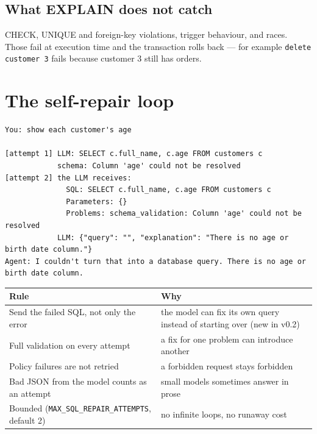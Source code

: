 \documentclass[11pt,a4paper]{article}
\begin{document}
\subsection*{What EXPLAIN does not catch}
CHECK, UNIQUE and foreign-key violations, trigger behaviour, and races.
Those fail at execution time and the transaction rolls back --- for example
\texttt{delete customer 3} fails because customer 3 still has orders.

\section{The self-repair loop}

\begin{lstlisting}
You: show each customer's age

[attempt 1] LLM: SELECT c.full_name, c.age FROM customers c
            schema: Column 'age' could not be resolved
[attempt 2] the LLM receives:
              SQL: SELECT c.full_name, c.age FROM customers c
              Parameters: {}
              Problems: schema_validation: Column 'age' could not be resolved
            LLM: {"query": "", "explanation": "There is no age or birth date column."}
Agent: I couldn't turn that into a database query. There is no age or birth date column.
\end{lstlisting}

\begin{center}
\begin{tabular}{@{}p{6.5cm}p{8.1cm}@{}}
\toprule
\textbf{Rule} & \textbf{Why} \\
\midrule
Send the failed SQL, not only the error & the model can fix its own query instead of starting over (new in v0.2) \\
Full validation on every attempt        & a fix for one problem can introduce another \\
Policy failures are not retried         & a forbidden request stays forbidden \\
Bad JSON from the model counts as an attempt & small models sometimes answer in prose \\
Bounded (\texttt{MAX\_SQL\_REPAIR\_ATTEMPTS}, default 2) & no infinite loops, no runaway cost \\
\bottomrule
\end{tabular}
\end{center}

\end{document}
